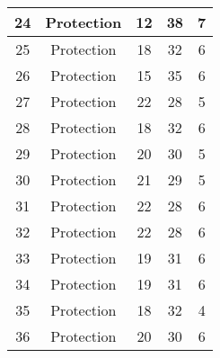 \documentclass[results.tex]{subfiles}
\begin{document}
\begin{center}
\begin{tabular}{| c || c | c | c | c |}
            \hline
            24                      & Protection                   & 12                     & 38                      & 7                    \\
            \hline
            25                      & Protection                   & 18                     & 32                      & 6                    \\
            \hline
            26                      & Protection                   & 15                     & 35                      & 6                    \\
            \hline
            27                      & Protection                   & 22                     & 28                      & 5                    \\
            \hline
            28                      & Protection                   & 18                     & 32                      & 6                    \\
            \hline
            29                      & Protection                   & 20                     & 30                      & 5                    \\
            \hline
            30                      & Protection                   & 21                     & 29                      & 5                    \\
            \hline
            31                      & Protection                   & 22                     & 28                      & 6                    \\
            \hline
            32                      & Protection                   & 22                     & 28                      & 6                    \\
            \hline
            33                      & Protection                   & 19                     & 31                      & 6                    \\
            \hline
            34                      & Protection                   & 19                     & 31                      & 6                    \\
            \hline
            35                      & Protection                   & 18                     & 32                      & 4                    \\
            \hline
            36                      & Protection                   & 20                     & 30                      & 6                    \\

\end{tabular}
\end{center}
\end{document}
